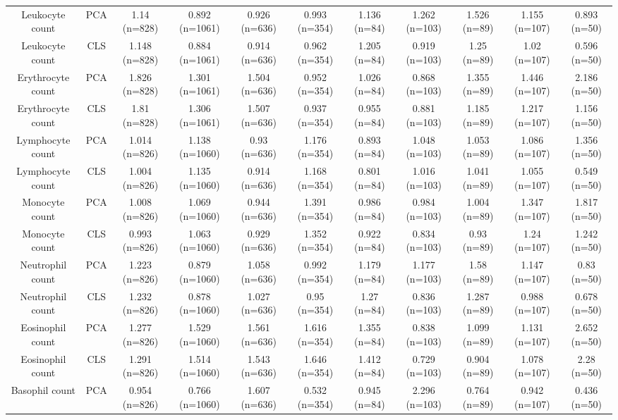 \begin{landscape}
\begin{table}[!htbp]
\begin{tabular}{ ccccccccccc}
Leukocyte count & PCA & 1.14 (n=828) & 0.892 (n=1061) & 0.926 (n=636) & 0.993 (n=354) & 1.136 (n=84) & 1.262 (n=103) & 1.526 (n=89) & 1.155 (n=107) & 0.893 (n=50) \\ 
Leukocyte count & CLS & 1.148 (n=828) & 0.884 (n=1061) & 0.914 (n=636) & 0.962 (n=354) & 1.205 (n=84) & 0.919 (n=103) & 1.25 (n=89) & 1.02 (n=107) & 0.596 (n=50) \\ 
Erythrocyte count & PCA & 1.826 (n=828) & 1.301 (n=1061) & 1.504 (n=636) & 0.952 (n=354) & 1.026 (n=84) & 0.868 (n=103) & 1.355 (n=89) & 1.446 (n=107) & 2.186 (n=50) \\ 
Erythrocyte count & CLS & 1.81 (n=828) & 1.306 (n=1061) & 1.507 (n=636) & 0.937 (n=354) & 0.955 (n=84) & 0.881 (n=103) & 1.185 (n=89) & 1.217 (n=107) & 1.156 (n=50) \\ 
Lymphocyte count & PCA & 1.014 (n=826) & 1.138 (n=1060) & 0.93 (n=636) & 1.176 (n=354) & 0.893 (n=84) & 1.048 (n=103) & 1.053 (n=89) & 1.086 (n=107) & 1.356 (n=50) \\ 
Lymphocyte count & CLS & 1.004 (n=826) & 1.135 (n=1060) & 0.914 (n=636) & 1.168 (n=354) & 0.801 (n=84) & 1.016 (n=103) & 1.041 (n=89) & 1.055 (n=107) & 0.549 (n=50) \\ 
Monocyte count & PCA & 1.008 (n=826) & 1.069 (n=1060) & 0.944 (n=636) & 1.391 (n=354) & 0.986 (n=84) & 0.984 (n=103) & 1.004 (n=89) & 1.347 (n=107) & 1.817 (n=50) \\ 
Monocyte count & CLS & 0.993 (n=826) & 1.063 (n=1060) & 0.929 (n=636) & 1.352 (n=354) & 0.922 (n=84) & 0.834 (n=103) & 0.93 (n=89) & 1.24 (n=107) & 1.242 (n=50) \\ 
Neutrophil count & PCA & 1.223 (n=826) & 0.879 (n=1060) & 1.058 (n=636) & 0.992 (n=354) & 1.179 (n=84) & 1.177 (n=103) & 1.58 (n=89) & 1.147 (n=107) & 0.83 (n=50) \\ 
Neutrophil count & CLS & 1.232 (n=826) & 0.878 (n=1060) & 1.027 (n=636) & 0.95 (n=354) & 1.27 (n=84) & 0.836 (n=103) & 1.287 (n=89) & 0.988 (n=107) & 0.678 (n=50) \\ 
Eosinophil count & PCA & 1.277 (n=826) & 1.529 (n=1060) & 1.561 (n=636) & 1.616 (n=354) & 1.355 (n=84) & 0.838 (n=103) & 1.099 (n=89) & 1.131 (n=107) & 2.652 (n=50) \\ 
Eosinophil count & CLS & 1.291 (n=826) & 1.514 (n=1060) & 1.543 (n=636) & 1.646 (n=354) & 1.412 (n=84) & 0.729 (n=103) & 0.904 (n=89) & 1.078 (n=107) & 2.28 (n=50) \\ 
Basophil count & PCA & 0.954 (n=826) & 0.766 (n=1060) & 1.607 (n=636) & 0.532 (n=354) & 0.945 (n=84) & 2.296 (n=103) & 0.764 (n=89) & 0.942 (n=107) & 0.436 (n=50) \\ 

\end{tabular}
\end{table}
\end{landscape}

